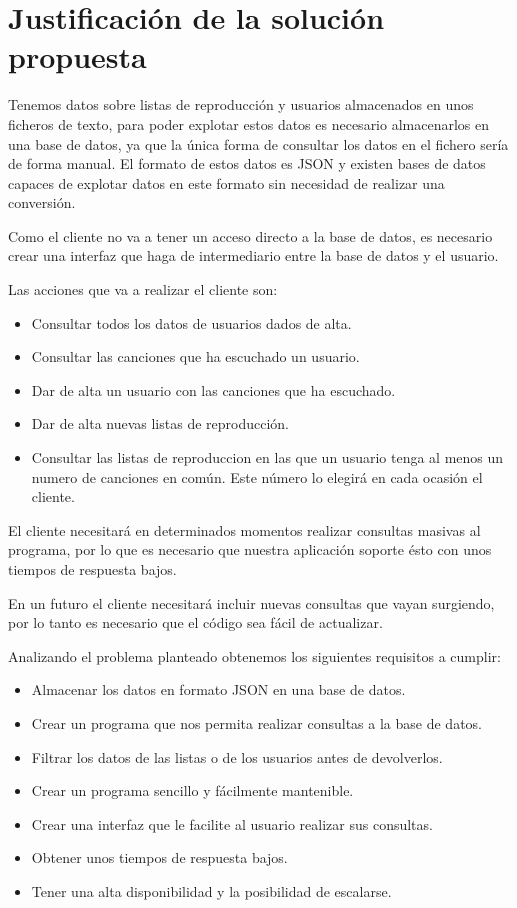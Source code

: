 \documentclass[12pt]{report} %
\begin{document}
\chapter{Justificación de la solución propuesta}

Tenemos datos sobre listas de reproducción y usuarios almacenados en unos ficheros de texto, para poder explotar estos datos es necesario almacenarlos en una base de datos, ya que la única forma de consultar los datos en el fichero sería de forma manual. El formato de estos datos es JSON y existen bases de datos capaces de explotar datos en este formato sin necesidad de realizar una conversión.

Como el cliente no va a tener un acceso directo a la base de datos, es necesario crear una interfaz que haga de intermediario entre la base de datos y el usuario.

Las acciones que va a realizar el cliente son:
\begin{itemize}
	\item Consultar todos los datos de usuarios dados de alta.
	\item Consultar las canciones que ha escuchado un usuario.
	\item Dar de alta un usuario con las canciones que ha escuchado.
	\item Dar de alta nuevas listas de reproducción.
	\item Consultar las listas de reproduccion en las que un usuario tenga al menos un numero de canciones en común. Este número lo elegirá en cada ocasión el cliente.
\end{itemize}

El cliente necesitará en determinados momentos realizar consultas masivas al programa, por lo que es necesario que nuestra aplicación soporte ésto con unos tiempos de respuesta bajos. 

En un futuro el cliente necesitará incluir nuevas consultas que vayan surgiendo, por lo tanto es necesario que el código sea fácil de actualizar.

Analizando el problema planteado obtenemos los siguientes requisitos a cumplir:
\begin{itemize}
	\item Almacenar los datos en formato JSON en una base de datos.
	\item Crear un programa que nos permita realizar consultas a la base de datos.
	\item Filtrar los datos de las listas o de los usuarios antes de devolverlos.
	\item Crear un programa sencillo y fácilmente mantenible.
	\item Crear una interfaz que le facilite al usuario realizar sus consultas.
	\item Obtener unos tiempos de respuesta bajos.
	\item Tener una alta disponibilidad y la posibilidad de escalarse.
\end{itemize}
\end{document}
